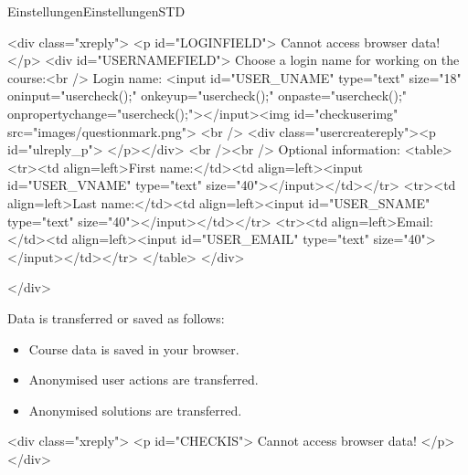 \begin{MXContent}{Einstellungen}{Einstellungen}{STD}
\MGlobalConfTag
{}

\begin{html}
<div class="xreply">
<p id="LOGINFIELD">
Cannot access browser data!
</p>
<div id="USERNAMEFIELD">
Choose a login name for working on the course:<br />
Login name: <input id="USER_UNAME" type="text" size="18" oninput="usercheck();" onkeyup="usercheck();" onpaste="usercheck();" onpropertychange="usercheck();"></input><img id="checkuserimg" src="images/questionmark.png">
<br />
<div class="usercreatereply"><p id="ulreply_p"> </p></div>
<br /><br />
Optional information:
<table>
  <tr><td align=left>First name:</td><td align=left><input id="USER_VNAME" type="text" size="40"></input></td></tr>
  <tr><td align=left>Last name:</td><td align=left><input id="USER_SNAME" type="text" size="40"></input></td></tr>
  <tr><td align=left>Email:</td><td align=left><input id="USER_EMAIL" type="text" size="40"></input></td></tr>
</table>
</div>

</div>

\end{html}





Data is transferred or saved as follows:

\begin{itemize}
\item{Course data is saved in your browser.}
\item{Anonymised user actions are transferred.}
\item{Anonymised solutions are transferred.}
\end{itemize}
\begin{html}
<div class="xreply">
<p id="CHECKIS">
Cannot access browser data!
</p>
</div>
\end{html}




\end{MXContent}
